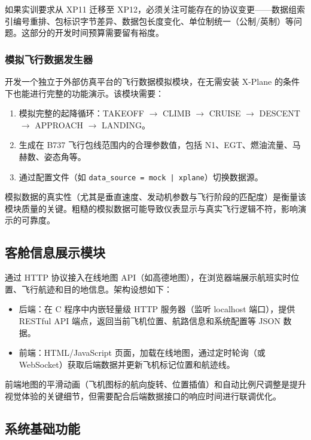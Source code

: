 \documentclass[12pt,a4paper]{ctexart}
\begin{document}
如果实训要求从 XP11 迁移至 XP12，必须关注可能存在的协议变更——数据组索引编号重排、包标识字节差异、数据包长度变化、单位制统一（公制/英制）等问题。这部分的开发时间预算需要留有裕度。

\subsubsection{模拟飞行数据发生器}

开发一个独立于外部仿真平台的飞行数据模拟模块，在无需安装 X-Plane 的条件下也能进行完整的功能演示。该模块需要：

\begin{enumerate}[leftmargin=*]
    \item 模拟完整的起降循环：TAKEOFF $\rightarrow$ CLIMB $\rightarrow$ CRUISE $\rightarrow$ DESCENT $\rightarrow$ APPROACH $\rightarrow$ LANDING。
    \item 生成在 B737 飞行包线范围内的合理参数值，包括 N1、EGT、燃油流量、马赫数、姿态角等。
    \item 通过配置文件（如 \texttt{data\_source = mock | xplane}）切换数据源。
\end{enumerate}

模拟数据的真实性（尤其是垂直速度、发动机参数与飞行阶段的匹配度）是衡量该模块质量的关键。粗糙的模拟数据可能导致仪表显示与真实飞行逻辑不符，影响演示的可靠度。

\subsection{客舱信息展示模块}

通过 HTTP 协议接入在线地图 API（如高德地图），在浏览器端展示航班实时位置、飞行航迹和目的地信息。架构设想如下：

\begin{itemize}
    \item 后端：在 C 程序中内嵌轻量级 HTTP 服务器（监听 localhost 端口），提供 RESTful API 端点，返回当前飞机位置、航路信息和系统配置等 JSON 数据。
    \item 前端：HTML/JavaScript 页面，加载在线地图，通过定时轮询（或 WebSocket）获取后端数据并更新飞机标记位置和航迹线。
\end{itemize}

前端地图的平滑动画（飞机图标的航向旋转、位置插值）和自动比例尺调整是提升视觉体验的关键细节，但需要配合后端数据接口的响应时间进行联调优化。

\subsection{系统基础功能}
\end{document}
